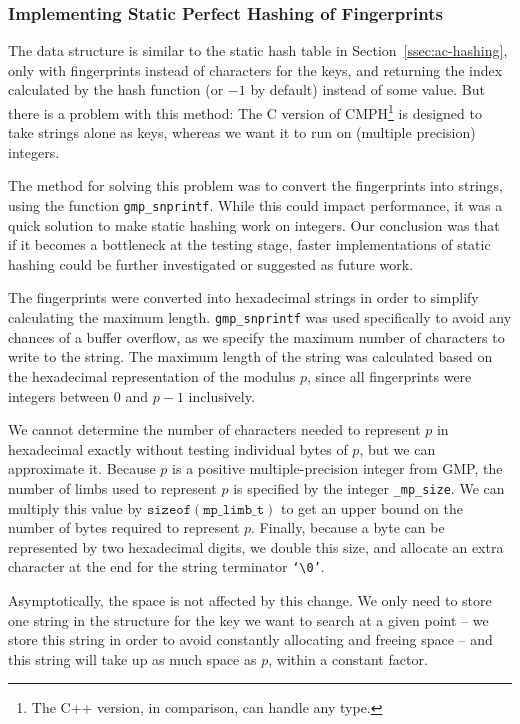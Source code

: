 \documentclass[ %
                    author={Dominic Joseph Moylett},
                    degree={MEng},
                     title={Dictionary Matching with Fingerprints},
                  subtitle={An Empirical Analysis},
                      type={research},
                      year={2015} ]{dissertation}
\begin{document}
\subsubsection{Implementing Static Perfect Hashing of Fingerprints}
\label{sssec:static-hashing-kr}

The data structure is similar to the static hash table in Section~\ref{ssec:ac-hashing}, only with fingerprints instead of characters for the keys, and returning the index calculated by the hash function (or $-1$ by default) instead of some value. But there is a problem with this method: The C version of CMPH\footnote{The C++ version, in comparison, can handle any type.} is designed to take strings alone as keys, whereas we want it to run on (multiple precision) integers.

The method for solving this problem was to convert the fingerprints into strings, using the function \texttt{gmp\_snprintf}. While this could impact performance, it was a quick solution to make static hashing work on integers. Our conclusion was that if it becomes a bottleneck at the testing stage, faster implementations of static hashing could be further investigated or suggested as future work.

The fingerprints were converted into hexadecimal strings in order to simplify calculating the maximum length. \texttt{gmp\_snprintf} was used specifically to avoid any chances of a buffer overflow, as we specify the maximum number of characters to write to the string. The maximum length of the string was calculated based on the hexadecimal representation of the modulus $p$, since all fingerprints were integers between 0 and $p - 1$ inclusively.

We cannot determine the number of characters needed to represent $p$ in hexadecimal exactly without testing individual bytes of $p$, but we can approximate it. Because $p$ is a positive multiple-precision integer from GMP, the number of limbs used to represent $p$ is specified by the integer \texttt{\_mp\_size}. We can multiply this value by $\texttt{sizeof}(\texttt{mp\_limb\_t})$ to get an upper bound on the number of bytes required to represent $p$. Finally, because a byte can be represented by two hexadecimal digits, we double this size, and allocate an extra character at the end for the string terminator \texttt{`\textbackslash0'}.

Asymptotically, the space is not affected by this change. We only need to store one string in the structure for the key we want to search at a given point -- we store this string in order to avoid constantly allocating and freeing space -- and this string will take up as much space as $p$, within a constant factor.
\end{document}
